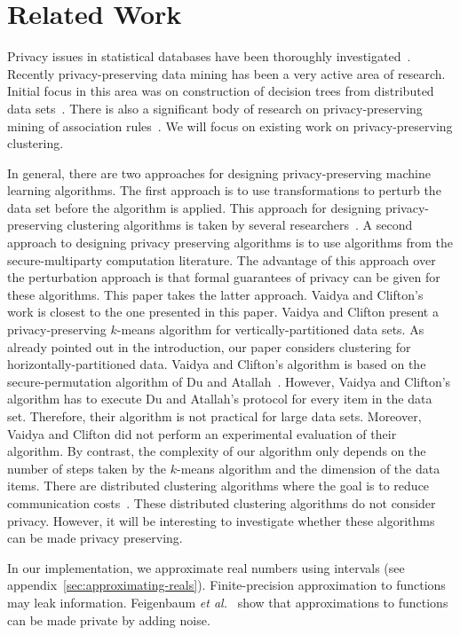 \section{Related Work}

Privacy issues in statistical databases have been thoroughly
investigated~\cite{Wortman89,Denning:TODS:80}.  Recently
privacy-preserving data mining has been a very active area of
research.  Initial focus in this area was on construction of decision
trees from distributed data
sets~\cite{Agrawal-Srikant,Lindell-Pinkas}. There is also a
significant body of research on privacy-preserving mining of
association
rules~\cite{Gehrke:2002,RizviHarista,VaidyaClifton:2002}. We will
focus on existing work on privacy-preserving clustering.

In general, there are two approaches for designing privacy-preserving
machine learning algorithms. The first approach is to use
transformations to perturb the data set before the algorithm is
applied. This approach for designing privacy-preserving clustering
algorithms is taken by several
researchers~\cite{Klusch,MeruguGhosh,Oliveira}. A second approach to
designing privacy preserving algorithms is to use algorithms from the
secure-multiparty computation literature. The advantage of this
approach over the perturbation approach is that formal guarantees of
privacy can be given for these algorithms. This paper takes the latter
approach. Vaidya and Clifton's~\cite{VaidyaClifton} work is closest to
the one presented in this paper. Vaidya and Clifton present a
privacy-preserving $k$-means algorithm for vertically-partitioned data
sets. As already pointed out in the introduction, our paper considers
clustering for horizontally-partitioned data. Vaidya and Clifton's
algorithm is based on the secure-permutation algorithm of Du and
Atallah~\cite{DuAtallah}. However, Vaidya and Clifton's algorithm has
to execute Du and Atallah's protocol for every item in the data
set. Therefore, their algorithm is not practical for large data sets.
Moreover, Vaidya and Clifton did not perform an experimental
evaluation of their algorithm.  By contrast, the complexity of our
algorithm only depends on the number of steps taken by the $k$-means
algorithm and the dimension of the data items. There are distributed
clustering algorithms where the goal is to reduce communication
costs~\cite{DhillonModha,Kargupta}.  These distributed clustering
algorithms do not consider privacy. However, it will be interesting to
investigate whether these algorithms can be made privacy preserving.

In our implementation, we approximate real numbers using intervals
(see appendix~\ref{sec:approximating-reals}).  Finite-precision
approximation to functions may leak information. Feigenbaum {\it et
al.}~\cite{Nissim:2001} show that approximations to functions can be
made private by adding noise.


